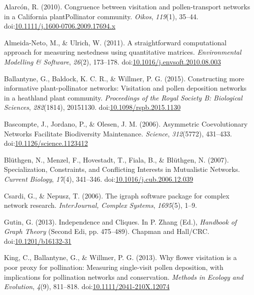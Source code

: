 \documentclass[a4paper]{artikel1}
\theoremstyle{definition}
\theoremstyle{definition}
\theoremstyle{definition}
\theoremstyle{remark}
\begin{document}
\hypertarget{refs}{}
\hypertarget{ref-alarcon_congruence_2010}{}
Alarcón, R. (2010). Congruence between visitation and pollen-transport
networks in a California plantPollinator community. \emph{Oikos},
\emph{119}(1), 35--44.
doi:\href{https://doi.org/10.1111/j.1600-0706.2009.17694.x}{10.1111/j.1600-0706.2009.17694.x}

\hypertarget{ref-almeida-neto_straightforward_2011}{}
Almeida-Neto, M., \& Ulrich, W. (2011). A straightforward computational
approach for measuring nestedness using quantitative matrices.
\emph{Environmental Modelling \& Software}, \emph{26}(2), 173--178.
doi:\href{https://doi.org/10.1016/j.envsoft.2010.08.003}{10.1016/j.envsoft.2010.08.003}

\hypertarget{ref-ballantyne_constructing_2015}{}
Ballantyne, G., Baldock, K. C. R., \& Willmer, P. G. (2015).
Constructing more informative plant-pollinator networks: Visitation and
pollen deposition networks in a heathland plant community.
\emph{Proceedings of the Royal Society B: Biological Sciences},
\emph{282}(1814), 20151130.
doi:\href{https://doi.org/10.1098/rspb.2015.1130}{10.1098/rspb.2015.1130}

\hypertarget{ref-bascompte_asymmetric_2006}{}
Bascompte, J., Jordano, P., \& Olesen, J. M. (2006). Asymmetric
Coevolutionary Networks Facilitate Biodiversity Maintenance.
\emph{Science}, \emph{312}(5772), 431--433.
doi:\href{https://doi.org/10.1126/science.1123412}{10.1126/science.1123412}

\hypertarget{ref-bluthgen_specialization_2007}{}
Blüthgen, N., Menzel, F., Hovestadt, T., Fiala, B., \& Blüthgen, N.
(2007). Specialization, Constraints, and Conflicting Interests in
Mutualistic Networks. \emph{Current Biology}, \emph{17}(4), 341--346.
doi:\href{https://doi.org/10.1016/j.cub.2006.12.039}{10.1016/j.cub.2006.12.039}

\hypertarget{ref-Csardi2006a}{}
Csardi, G., \& Nepusz, T. (2006). The igraph software package for
complex network research. \emph{InterJournal, Complex Systems},
\emph{1695}(5), 1--9.

\hypertarget{ref-Gutin2013}{}
Gutin, G. (2013). Independence and Cliques. In P. Zhang (Ed.),
\emph{Handbook of Graph Theory} (Second Edi, pp. 475--489). Chapman and
Hall/CRC.
doi:\href{https://doi.org/10.1201/b16132-31}{10.1201/b16132-31}

\hypertarget{ref-king_why_2013}{}
King, C., Ballantyne, G., \& Willmer, P. G. (2013). Why flower
visitation is a poor proxy for pollination: Measuring single-visit
pollen deposition, with implications for pollination networks and
conservation. \emph{Methods in Ecology and Evolution}, \emph{4}(9),
811--818.
doi:\href{https://doi.org/10.1111/2041-210X.12074}{10.1111/2041-210X.12074}
\end{document}
